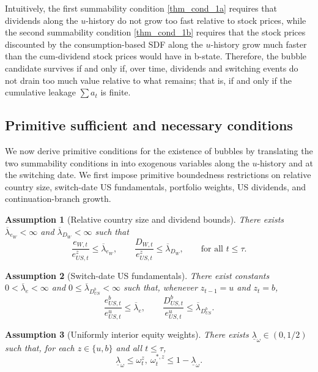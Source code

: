 \documentclass[12pt]{article}
\theoremstyle{plain}
\newtheorem{ass}{Assumption}
\begin{document}
Intuitively, the first summability condition \eqref{thm_cond_1a} requires that dividends along the $u$-history 
do not grow too fast relative to stock prices, while the second summability condition \eqref{thm_cond_1b} requires that the stock prices discounted by the consumption-based SDF along the $u$-history grow much faster than the cum-dividend stock prices would have in b-state. Therefore, the bubble candidate survives if and only if,
 over time, dividends and switching events do not drain too much value relative to what remains; that is, 
 if and only if the cumulative leakage $\sum a_t$ is finite.

\subsection{Primitive sufficient and necessary conditions}

We now derive primitive conditions for the existence of bubbles by translating the two summability conditions
in  into exogenous variables along the $u$-history and at the switching date. We first impose
primitive boundedness restrictions on relative country size, switch-date US fundamentals, portfolio weights,
US dividends, and continuation-branch growth.

\begin{ass}[Relative country size and dividend bounds]\label{ass_relative_dividend_bounds}
There exists $\overline\lambda_{e_W}<\infty$ and $\overline\lambda_{D_W}<\infty$ such that
\[
\frac{e_{W,t}}{e_{US,t}^z}\le \overline\lambda_{e_W},
\qquad
\frac{D_{W,t}}{e_{US,t}^z}\le \overline\lambda_{D_W},
\qquad\text{for all }t\le \tau.
\]
\end{ass}

\begin{ass}[Switch-date US fundamentals]\label{ass_switch_us_fundamentals}
There exist constants $0< \overline\lambda_e<\infty$ and
$0\le \overline\lambda_{D^b_{US}}<\infty$ such that, whenever $z_{t-1}=u$ and $z_t=b$,
\[
\frac{e_{US,t}^b}{e_{US,t}^u}
\le
\overline\lambda_e,
\qquad
\frac{D_{US,t}^b}{e_{US,t}^u}
\le
\overline\lambda_{D^b_{US}}.
\]
\end{ass}

\begin{ass}[Uniformly interior equity weights]\label{ass_interior_equity_weights}
There exists $\underline\lambda_\omega\in(0,1/2)$ such that, for each
$z\in\{u,b\}$ and all $t\le \tau$,
\[
\underline\lambda_\omega
\le
\omega_t^z,\ \omega_t^{*,z}
\le
1-\underline\lambda_\omega.
\]
\end{ass}
\end{document}
